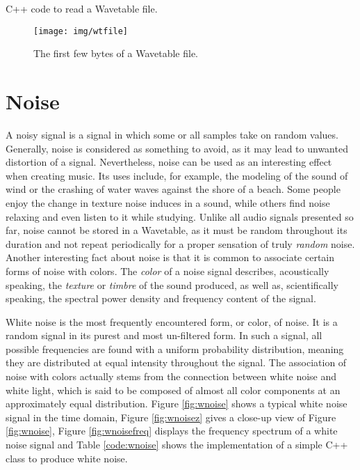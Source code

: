 \begin{table}[h!]
  \caption{C++ code to read a Wavetable file. }
  \label{code:wtfile}
\end{table}

\begin{figure}[h!]
  \texttt{[image: img/wtfile]}
  \caption{The first few bytes of a Wavetable file.}
  \label{fig:wtfile}
\end{figure}

\section{Noise}

A noisy signal is a signal in which some or all samples take on random values. Generally, noise is considered as something to avoid, as it may lead to unwanted distortion of a signal. Nevertheless, noise can be used as an interesting effect when creating music. Its uses include, for example, the modeling of the sound of wind or the crashing of water waves against the shore of a beach. Some people enjoy the change in texture noise induces in a sound, while others find noise relaxing and even listen to it while studying.  Unlike all audio signals presented so far, noise cannot\footnotemark{} be stored in a Wavetable, as it must be random throughout its duration and not repeat periodically for a proper sensation of truly \emph{random} noise. Another interesting fact about noise is that it is common to associate certain forms of noise with colors. The \emph{color} of a noise signal describes, acoustically speaking, the \emph{texture} or \emph{timbre} \footnotemark[2]{} of the sound produced, as well as, scientifically speaking, the spectral power density and frequency content of the signal. \parbreak

White noise is the most frequently encountered form, or color, of noise. It is a random signal in its purest and most un-filtered form. In such a signal, all possible frequencies are found with a uniform probability distribution, meaning they are distributed at equal intensity throughout the signal. The association of noise with colors actually stems from the connection between white noise and white light, which is said to be composed of almost all color components at an approximately equal distribution. Figure \ref{fig:wnoise} shows a typical white noise signal in the time domain, Figure \ref{fig:wnoisez} gives a close-up view of Figure \ref{fig:wnoise}, Figure \ref{fig:wnoisefreq} displays the frequency spectrum of a white noise signal and Table \ref{code:wnoise} shows the implementation of a simple C++ class to produce white noise.


